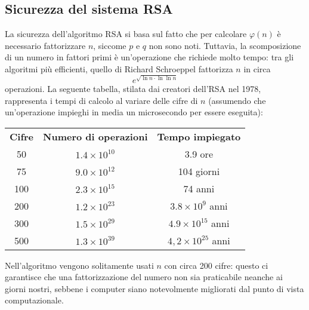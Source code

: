 \documentclass[italian,A4,12pt]{article}
\begin{document}
      \subsection{Sicurezza del sistema RSA}
      La sicurezza dell'algoritmo RSA si basa sul fatto che per calcolare $\varphi(n)$ è necessario fattorizzare $n$, siccome $p$ e $q$ non sono noti.
      Tuttavia, la scomposizione di un numero in fattori primi è un'operazione che richiede molto tempo: tra gli algoritmi più efficienti, quello di Richard Schroeppel fattorizza $n$ in circa $$e^{\sqrt{\ln{n}\cdot\ln{\ln{n}}}}$$
      operazioni. La seguente tabella, stilata dai creatori dell'RSA nel 1978, rappresenta i tempi di calcolo al variare delle cifre di $n$ (assumendo che un'operazione impieghi in media un microsecondo per essere eseguita):
      ~\\
      \begin{center}
        \begin{tabular}{c c c}
          \textbf{Cifre}&\textbf{Numero di operazioni}&\textbf{Tempo impiegato}\\
          50&$1.4\times 10^{10}$&3.9 ore\\
          75&$9.0\times 10^{12}$&104 giorni\\
          100&$2.3\times 10^{15}$&74 anni\\
          200&$1.2\times 10^{23}$&$3.8\times 10^9$ anni\\
          300&$1.5\times 10^{29}$&$4.9\times 10^{15}$ anni\\
          500&$1.3\times 10^{39}$&$4,2\times 10^{25}$ anni\\

        \end{tabular}
      \end{center}
      Nell'algoritmo vengono solitamente usati $n$ con circa 200 cifre: questo ci garantisce che una fattorizzazione del numero non sia praticabile neanche ai giorni nostri, sebbene i computer siano notevolmente migliorati dal punto di vista computazionale.

      \newpage
\end{document}
